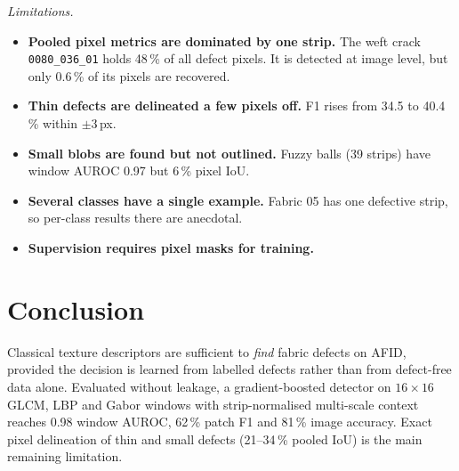 \documentclass[conference]{IEEEtran}
\begin{document}
\emph{Limitations.}
\begin{itemize}
  \item \textbf{Pooled pixel metrics are dominated by one strip.} The weft crack \texttt{0080\_036\_01} holds 48\,\% of all defect pixels. It is detected at image level, but only 0.6\,\% of its pixels are recovered.
  \item \textbf{Thin defects are delineated a few pixels off.} F1 rises from 34.5 to 40.4\,\% within $\pm3$\,px.
  \item \textbf{Small blobs are found but not outlined.} Fuzzy balls (39 strips) have window AUROC 0.97 but 6\,\% pixel IoU.
  \item \textbf{Several classes have a single example.} Fabric 05 has one defective strip, so per-class results there are anecdotal.
  \item \textbf{Supervision requires pixel masks for training.}
\end{itemize}

\section{Conclusion}
Classical texture descriptors are sufficient to \emph{find} fabric defects on AFID, provided the decision is learned from labelled defects rather than from defect-free data alone. Evaluated without leakage, a gradient-boosted detector on $16\times16$ GLCM, LBP and Gabor windows with strip-normalised multi-scale context reaches 0.98 window AUROC, 62\,\% patch F1 and 81\,\% image accuracy. Exact pixel delineation of thin and small defects (21--34\,\% pooled IoU) is the main remaining limitation.



\end{document}
